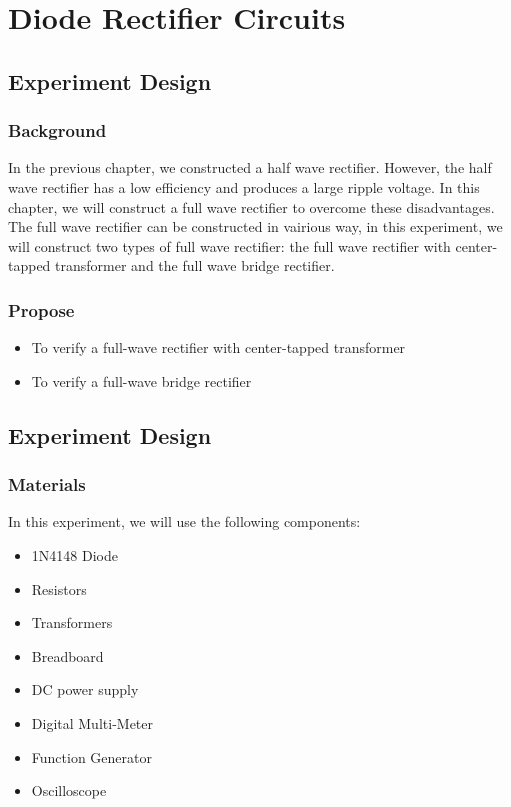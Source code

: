 \section{Diode Rectifier Circuits}

\subsection{Experiment Design}
    \subsubsection{Background}
        In the previous chapter, we constructed a half wave rectifier. However, the half wave rectifier has a low efficiency and produces a large ripple voltage. In this chapter, we will construct a full wave rectifier to overcome these disadvantages. The full wave rectifier can be constructed in vairious way, in this experiment, we will construct two types of full wave rectifier: the full wave rectifier with center-tapped transformer and the full wave bridge rectifier.

    \subsubsection{Propose}
    \begin{itemize}
        \item To verify a full-wave rectifier with center-tapped transformer
        \item To verify a full-wave bridge rectifier
    \end{itemize}

\subsection{Experiment Design}
    \subsubsection{Materials}
        In this experiment, we will use the following components:
        \begin{itemize}
            \item 1N4148 Diode
            \item Resistors
            \item Transformers
            \item Breadboard
            \item DC power supply
            \item Digital Multi-Meter
            \item Function Generator
            \item Oscilloscope
        \end{itemize}

